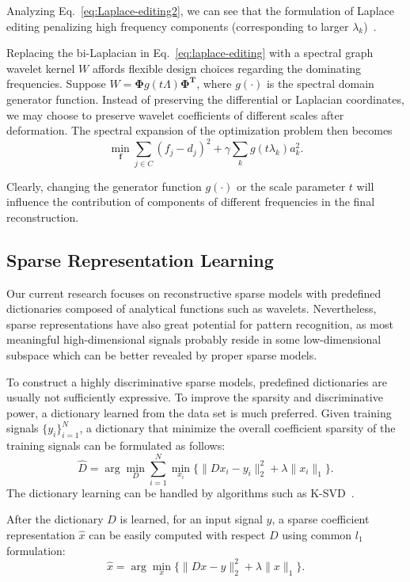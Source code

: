 Analyzing Eq.~\ref{eq:Laplace-editing2}, we can see that the formulation of Laplace
editing penalizing high frequency components (corresponding to larger
$\lambda_k$)~\cite{Rustamov:2009:ICMS}.

Replacing the bi-Laplacian in Eq.~\ref{eq:laplace-editing} with a spectral graph wavelet kernel
$W$ affords flexible design choices regarding the dominating frequencies. Suppose
$W=\mathbf{\Phi}g(t\Lambda)\mathbf{\Phi^T}$, where $g(\cdot)$ is the spectral domain generator
function. Instead of preserving the differential or Laplacian coordinates, we may choose
to preserve wavelet coefficients of different scales after deformation. The spectral expansion
of the optimization problem then becomes
\begin{equation}
\label{eq:sgw-editing}
\min_\mathbf{f} \sum_{j\in C} (f_j - d_j)^2 + \gamma \sum_k g(t\lambda_k) a_k^2.
\end{equation}

Clearly, changing the generator function $g(\cdot)$ or the scale parameter $t$ will
influence the contribution of components of different frequencies in the final reconstruction.

\subsection{Sparse Representation Learning}
Our current research focuses on reconstructive sparse models with predefined dictionaries
composed of analytical functions such as wavelets. Nevertheless, sparse representations have
also great potential for pattern recognition, as most meaningful high-dimensional
signals probably reside in some low-dimensional subspace which can be better revealed by proper
sparse models.

To construct a highly discriminative sparse models, predefined dictionaries are usually not
sufficiently expressive. To improve the sparsity and discriminative power, a dictionary learned from
the data set is much preferred. Given training signals $\{y_i\}_{i=1}^N$, a dictionary that
minimize the overall coefficient sparsity of the training signals can be formulated as follows:
\begin{equation}
\label{eq:dictionary-learning}
\hat{D}=\arg\min_D\sum_{i=1}^N \min_{x_i}\{\|Dx_i - y_i\|_2^2 + \lambda\|x_i\|_1\}.
\end{equation}
The dictionary learning can be handled by algorithms such as K-SVD~\cite{Aharon2006}.

After the dictionary $D$ is learned, for an input signal $y$, a sparse coefficient
representation $\hat{x}$ can be easily computed with respect $D$ using
common $l_1$ formulation:
\begin{equation}
\hat{x} = \arg\min_{x} \{\|Dx - y\|_2^2 + \lambda\|x\|_1\}.
\end{equation}


